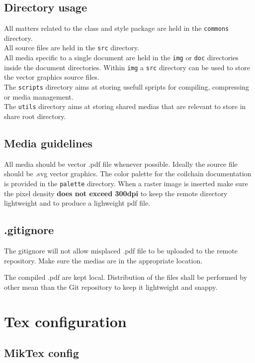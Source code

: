 \documentclass[technicalreport]{coilchain}
\begin{document}
\subsection{Directory usage}
All matters related to the class and style package are held in the \texttt{commons} directory.\\
All source files are held in the \texttt{src} directory.\\
All media specific to a single document are held in the \texttt{img} or \texttt{doc} directories inside the document directories. Within \texttt{img} a \texttt{src} directory can be used to store the vector graphics source files.\\

The \texttt{scripts} directory aims at storing usefull spripts for compiling, compressing or media management.\\

The \texttt{utils} directory aims at storing shared medias that are relevant to store in share root directory.

\subsection{Media guidelines}
All media should be vector .pdf file whenever possible.
Ideally the source file should be .svg vector graphics.
The color palette for the coilchain documentation is provided in the \texttt{palette} directory.
When a raster image is inserted make sure the pixel density \textbf{does not exceed 300dpi} to keep the remote directory lightweight and to produce a lighweight pdf file.

\subsection{.gitignore}
The gitignore will not allow misplaced .pdf file to be uploaded to the remote repository. Make sure the medias are in the appropriate location.

The compiled .pdf are kept local. Distribution of the files shall be performed by other mean than the Git repository to keep it lightweight and snappy.

\section{Tex configuration}
\subsection{MikTex config}

\end{document}
